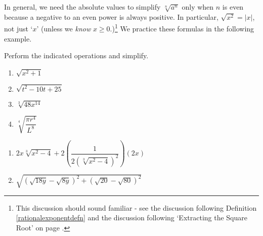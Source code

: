 \documentclass{ximera}
\begin{document}
\medskip

In general, we need the absolute values to simplify $\sqrt[n]{a^{n}}$ only when $n$ is even because a negative to an even power is always positive.  In particular, $\sqrt{x^2} = |x|$, not just `$x$' (unless we \textit{know} $x \geq 0$.)\footnote{This discussion should sound familiar - see the discussion following Definition \ref{rationalexponentdefn} and the discussion following `Extracting the Square Root' on page \pageref{extractingthesquareroot}.}  We practice these formulas in the following example.

\begin{example}\label{simplifyradexpressions}  Perform the indicated operations and simplify.

\begin{multicols}{4}

\begin{enumerate}

\item  $\sqrt{x^{2} + 1}$

\item  $\sqrt{t^2-10t+25}$

\item  $\sqrt[3]{48x^{14}}$

\item  $\sqrt[4]{\dfrac{\pi r^{4}}{L^{8}}}$


\setcounter{HW}{\value{enumi}}

\end{enumerate}

\end{multicols}

\begin{multicols}{2}

\begin{enumerate}
\setcounter{enumi}{\value{HW}}

\item $2x \sqrt[3]{x^2-4} + 2\left(\dfrac{1}{2(\sqrt[3]{x^2-4})^2}\right)  (2x)$ 

\item  $\sqrt{(\sqrt{18y} - \sqrt{8y})^2 + (\sqrt{20} - \sqrt{80})^2}$ 

\end{enumerate}

\end{multicols}


\end{example}
\end{document}
